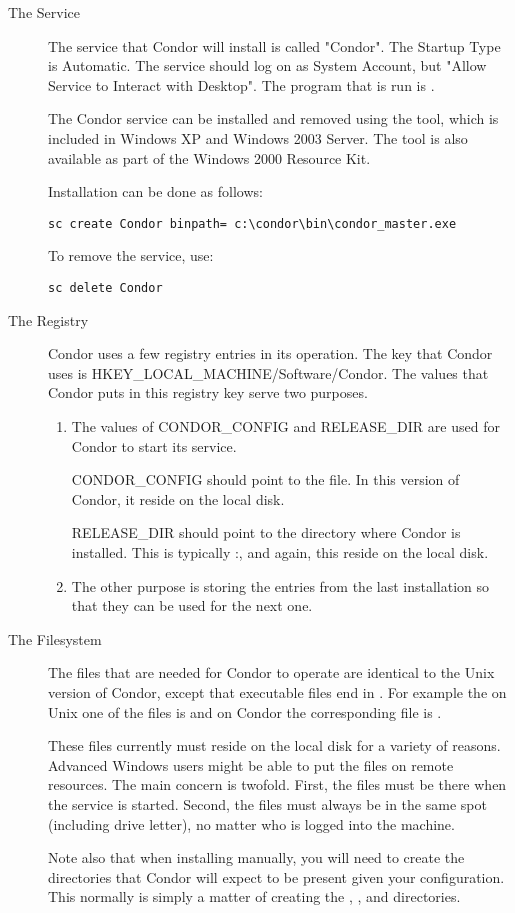 \begin{description}
\item [The Service]
The service that Condor will install is called "Condor".  The Startup
Type is Automatic.  The service should log on as System Account, but
 "Allow Service to Interact with Desktop".  The
program that is run is .

The Condor service can be installed and removed using the
 tool, which is included in Windows XP and Windows 2003
Server. The tool is also available as part of the Windows 2000
Resource Kit.

Installation can be done as follows:
\begin{verbatim}
sc create Condor binpath= c:\condor\bin\condor_master.exe
\end{verbatim}

To remove the service, use:
\begin{verbatim}
sc delete Condor
\end{verbatim}

\item [The Registry]
Condor uses a few registry entries in its operation.  The key that Condor
uses is HKEY\_LOCAL\_MACHINE/Software/Condor.  The values that Condor puts
in this registry key serve two purposes.
\begin{enumerate}
\item The values of CONDOR\_CONFIG and RELEASE\_DIR are used for Condor
to start its service.

CONDOR\_CONFIG should point to the  file.  In this version
of Condor, it  reside on the local disk.

RELEASE\_DIR should point to the directory where Condor is installed.  This
is typically
\verb@C:\Condor@, and again, this  reside on the
local disk.

\item The other purpose is storing the entries from the last installation
so that they can be used for the next one.
\end{enumerate}

\item [The Filesystem]
The files that are needed for Condor to operate are identical to the Unix
version of Condor, except that executable files end in .  For
example the on Unix one of the files is  and on Condor
the corresponding file is .

These files currently must reside on the local disk for a variety of reasons.
Advanced Windows users might be able to put the files on remote resources.
The main concern is twofold.  First, the files must be there when the service
is started.  Second, the files must always be in the same spot (including
drive letter), no matter who is logged into the machine.  

Note also that when installing manually, you will need to create the
directories that Condor will expect to be present given your
configuration. This normally is simply a matter of creating the
, , and  directories.

\end{description}


